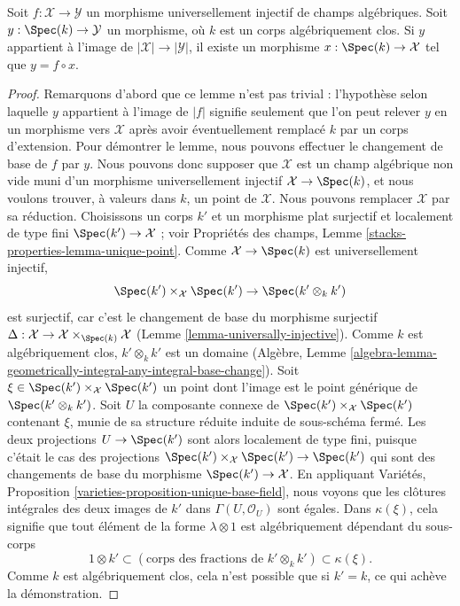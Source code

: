 \begin{lemma}
\label{lemma-universally-injective-point}
Soit $f : \mathcal{X} \to \mathcal{Y}$ un morphisme universellement
injectif de champs algébriques. Soit
$y : \Spec(k) \to \mathcal{Y}$ un morphisme, où $k$ est un corps
algébriquement clos. Si $y$ appartient à l'image de
$|\mathcal{X}| \to |\mathcal{Y}|$, il existe un morphisme
$x : \Spec(k) \to \mathcal{X}$ tel que $y = f \circ x$.
\end{lemma}

\begin{proof}
Remarquons d'abord que ce lemme n'est pas trivial : l'hypothèse selon
laquelle $y$ appartient à l'image de $|f|$ signifie seulement que l'on
peut relever $y$ en un morphisme vers $\mathcal{X}$ après avoir
éventuellement remplacé $k$ par un corps d'extension. Pour démontrer le
lemme, nous pouvons effectuer le changement de base de $f$ par $y$.
Nous pouvons donc supposer que $\mathcal{X}$ est un champ algébrique
non vide muni d'un morphisme universellement injectif
$\mathcal{X} \to \Spec(k)$, et nous voulons trouver, à valeurs dans $k$,
un point de $\mathcal{X}$. Nous pouvons remplacer $\mathcal{X}$ par sa réduction.
Choisissons un corps $k'$ et un morphisme plat surjectif et localement
de type fini $\Spec(k') \to \mathcal{X}$ ; voir Propriétés des champs,
Lemme \ref{stacks-properties-lemma-unique-point}.
Comme $\mathcal{X} \to \Spec(k)$ est universellement injectif,
$$
\Spec(k') \times_\mathcal{X} \Spec(k') \to \Spec(k' \otimes_k k')
$$
est surjectif, car c'est le changement de base du morphisme surjectif
$\Delta : \mathcal{X} \to \mathcal{X} \times_{\Spec(k)} \mathcal{X}$
(Lemme \ref{lemma-universally-injective}).
Comme $k$ est algébriquement clos, $k' \otimes_k k'$ est un domaine
(Algèbre, Lemme
\ref{algebra-lemma-geometrically-integral-any-integral-base-change}).
Soit $\xi \in \Spec(k') \times_\mathcal{X} \Spec(k')$
un point dont l'image est le point générique de $\Spec(k' \otimes_k k')$.
Soit $U$ la composante connexe de
$\Spec(k') \times_\mathcal{X} \Spec(k')$ contenant $\xi$, munie de
sa structure réduite induite de sous-schéma fermé. Les deux projections
$U \to \Spec(k')$ sont alors localement de type fini, puisque c'était
le cas des projections
$\Spec(k') \times_\mathcal{X} \Spec(k') \to \Spec(k')$
qui sont des changements de base du morphisme
$\Spec(k') \to \mathcal{X}$. En appliquant Variétés, Proposition
\ref{varieties-proposition-unique-base-field}, nous voyons que les
clôtures intégrales des deux images de $k'$ dans
$\Gamma(U, \mathcal{O}_U)$ sont égales. Dans $\kappa(\xi)$, cela signifie
que tout élément de la forme $\lambda \otimes 1$ est algébriquement
dépendant du sous-corps
$$
1 \otimes k' \subset 
(\text{corps des fractions de }k' \otimes_k k') \subset
\kappa(\xi).
$$
Comme $k$ est algébriquement clos, cela n'est possible que si
$k' = k$, ce qui achève la démonstration.
\end{proof}

